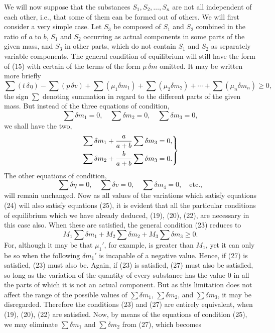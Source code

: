 \documentclass[11pt]{article}
\begin{document}
We will now suppose that the substances \(S_1,S_2,\ldots,S_n\) are not all independent of each other, i.e., that some of them can be formed out of others. We will first consider a very simple case. Let \(S_3\) be composed of \(S_1\) and \(S_2\) combined in the ratio of \(a\) to \(b\), \(S_1\) and \(S_2\) occurring as actual components in some parts of the given mass, and \(S_3\) in other parts, which do not contain \(S_1\) and \(S_2\) as separately variable components. The general condition of equilibrium will still have the form of (15) with certain of the terms of the form \(\mu\,\delta m\) omitted. It may be written more briefly
\begin{equation}
\sum(t\,\delta\eta)-\sum(p\,\delta v)
+\sum(\mu_1\delta m_1)+\sum(\mu_2\delta m_2)+\cdots
+\sum(\mu_n\delta m_n)\geq 0,
\end{equation}
the sign \(\sum\) denoting summation in regard to the different parts of the given mass. But instead of the three equations of condition,
\begin{equation}
\sum\delta m_1=0,\quad
\sum\delta m_2=0,\quad
\sum\delta m_3=0,
\end{equation}
we shall have the two,
\begin{equation}
\left.
\begin{aligned}
\sum\delta m_1 + {a\over a+b}\sum\delta m_3&=0,\\
\sum\delta m_2 + {b\over a+b}\sum\delta m_3&=0.
\end{aligned}
\right\}
\end{equation}
The other equations of condition,
\begin{equation}
\sum\delta\eta=0,\quad \sum\delta v=0,\quad \sum\delta m_4=0,\quad \text{etc.},
\end{equation}
will remain unchanged. Now as all values of the variations which satisfy equations (24) will also satisfy equations (25), it is evident that all the particular conditions of equilibrium which we have already deduced, (19), (20), (22), are necessary in this case also. When these are satisfied, the general condition (23) reduces to
\begin{equation}
M_1\sum\delta m_1+M_2\sum\delta m_2+M_3\sum\delta m_3\geq 0.
\end{equation}
For, although it may be that \(\mu_1'\), for example, is greater than \(M_1\), yet it can only be so when the following \(\delta m_1'\) is incapable of a negative value. Hence, if (27) is satisfied, (23) must also be. Again, if (23) is satisfied, (27) must also be satisfied, so long as the variation of the quantity of every substance has the value 0 in all the parts of which it is not an actual component. But as this limitation does not affect the range of the possible values of \(\sum\delta m_1\), \(\sum\delta m_2\), and \(\sum\delta m_3\), it may be disregarded. Therefore the conditions (23) and (27) are entirely equivalent, when (19), (20), (22) are satisfied. Now, by means of the equations of condition (25), we may eliminate \(\sum\delta m_1\) and \(\sum\delta m_2\) from (27), which becomes
\end{document}
